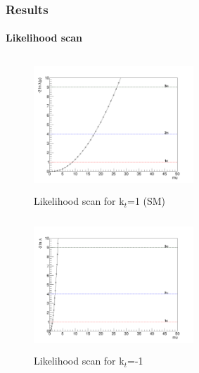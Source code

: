\documentclass[11pt]{beamer}
\begin{document}
\begin{frame}
\frametitle{Results}
\framesubtitle{Likelihood scan}
\begin{minipage}{0.5\textwidth}
	\begin{center}
		\begin{figure}
			\includegraphics[width=6cm,height=5cm]{figures/Likelihood.png}
			\caption*{Likelihood scan for k$_t$=1 (SM)}
		\end{figure}
	\end{center}
\end{minipage}\hfill
\begin{minipage}{0.5\textwidth}
	\begin{center}
		\begin{figure}
			\includegraphics[width=6cm,height=5cm]{figures/kt-1/Likelihood-kt-1.png}
			\caption*{Likelihood scan for k$_t$=-1}
		\end{figure}
	\end{center}
\end{minipage}
\end{frame}
\end{document}
